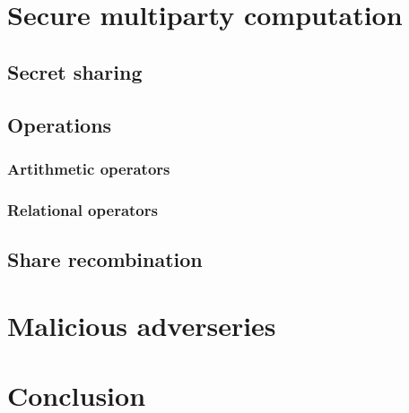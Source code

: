 \section{Secure multiparty computation}
\subsection{Secret sharing}
\subsection{Operations}
\subsubsection{Artithmetic operators}
\subsubsection{Relational operators}
\subsection{Share recombination}

\section{Malicious adverseries}

\section{Conclusion}
